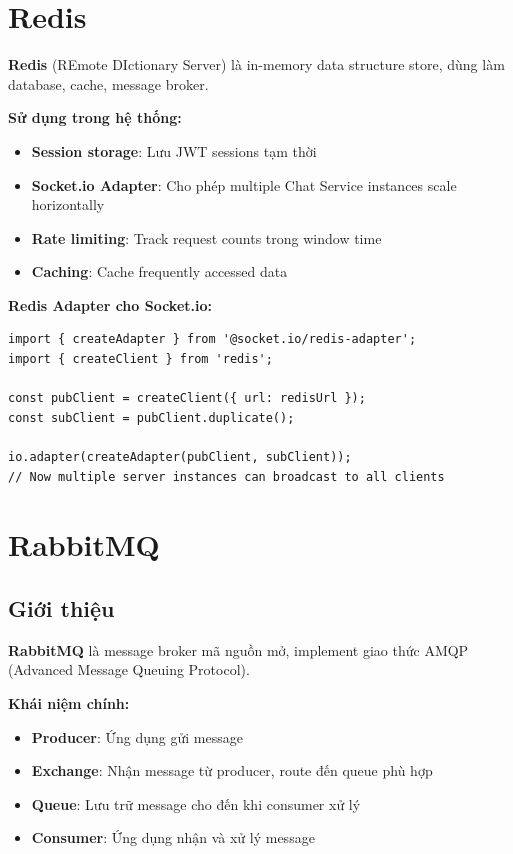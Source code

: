 \documentclass[12pt]{extreport}
\begin{document}
\section{Redis}

\textbf{Redis} (REmote DIctionary Server) là in-memory data structure store, dùng làm database, cache, message broker.

\textbf{Sử dụng trong hệ thống:}
\begin{itemize}
    \item \textbf{Session storage}: Lưu JWT sessions tạm thời
    \item \textbf{Socket.io Adapter}: Cho phép multiple Chat Service instances scale horizontally
    \item \textbf{Rate limiting}: Track request counts trong window time
    \item \textbf{Caching}: Cache frequently accessed data
\end{itemize}

\textbf{Redis Adapter cho Socket.io:}
\begin{lstlisting}[style=TypeScriptStyle, caption={Redis Adapter Configuration}]
import { createAdapter } from '@socket.io/redis-adapter';
import { createClient } from 'redis';

const pubClient = createClient({ url: redisUrl });
const subClient = pubClient.duplicate();

io.adapter(createAdapter(pubClient, subClient));
// Now multiple server instances can broadcast to all clients
\end{lstlisting}

\section{RabbitMQ}

\subsection{Giới thiệu}

\textbf{RabbitMQ} là message broker mã nguồn mở, implement giao thức AMQP (Advanced Message Queuing Protocol).

\textbf{Khái niệm chính:}
\begin{itemize}
    \item \textbf{Producer}: Ứng dụng gửi message
    \item \textbf{Exchange}: Nhận message từ producer, route đến queue phù hợp
    \item \textbf{Queue}: Lưu trữ message cho đến khi consumer xử lý
    \item \textbf{Consumer}: Ứng dụng nhận và xử lý message
\end{itemize}
\end{document}
